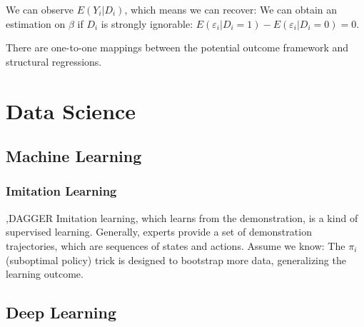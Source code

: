 \documentclass[10pt]{report}
\begin{document}
We can observe $E(Y_i|D_i)$, which means we can recover:
We can obtain an estimation on $\beta$ if $D_i$ is strongly ignorable: $E(\varepsilon_{i} | D_{i} = 1)-E(\varepsilon_{i} | D_{i} = 0)=0$. 
\begin{center}
    There are one-to-one mappings between the potential outcome framework and structural regressions.
\end{center}

\clearpage
\chapter{Data Science}

\section{Machine Learning}



\subsection{Imitation Learning}

\sep{DAGGER}
Imitation learning, which learns from the demonstration, is a kind of supervised learning. Generally, experts provide a set of demonstration trajectories, which are sequences of states
and actions. Assume we know:
The $\pi_i$ (suboptimal policy) trick is designed to bootstrap more data, generalizing the learning outcome.

\clearpage
\section{Deep Learning}
\end{document}
